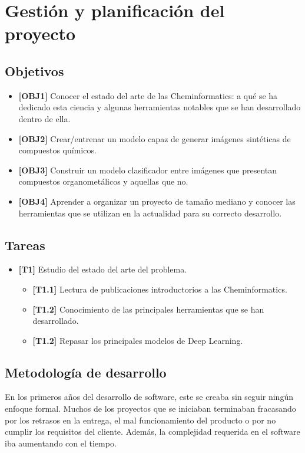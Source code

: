 \chapter*{Gestión y planificación del proyecto}

\section*{Objetivos}

\begin{itemize}
    \item \textbf{[OBJ1]} Conocer el estado del arte de las Cheminformatics: a qué se ha dedicado esta ciencia y algunas herramientas notables que se han desarrollado dentro de ella.
    \item \textbf{[OBJ2]} Crear/entrenar un modelo capaz de generar imágenes sintéticas de compuestos químicos.
    \item \textbf{[OBJ3]} Construir un modelo clasificador entre imágenes que presentan compuestos organometálicos y aquellas que no.
    \item \textbf{[OBJ4]} Aprender a organizar un proyecto de tamaño mediano y conocer las herramientas que se utilizan en la actualidad para su correcto desarrollo.
\end{itemize}

\section*{Tareas}
\begin{itemize}
    \item \textbf{[T1]} Estudio del estado del arte del problema.
    \begin{itemize}
        \item \textbf{[T1.1]} Lectura de publicaciones introductorios a las Cheminformatics.  
        \item \textbf{[T1.2]} Conocimiento de las principales herramientas que se han desarrollado.
        \item \textbf{[T1.2]} Repasar los principales modelos de Deep Learning.
    \end{itemize}
\end{itemize}

\section*{Metodología de desarrollo}

En los primeros años del desarrollo de software, este se creaba sin seguir ningún enfoque formal. Muchos de los proyectos que se iniciaban terminaban fracasando por los retrasos en la entrega, el mal funcionamiento del producto o por no cumplir los requisitos del cliente. Además, la complejidad requerida en el software iba aumentando con el tiempo. 


